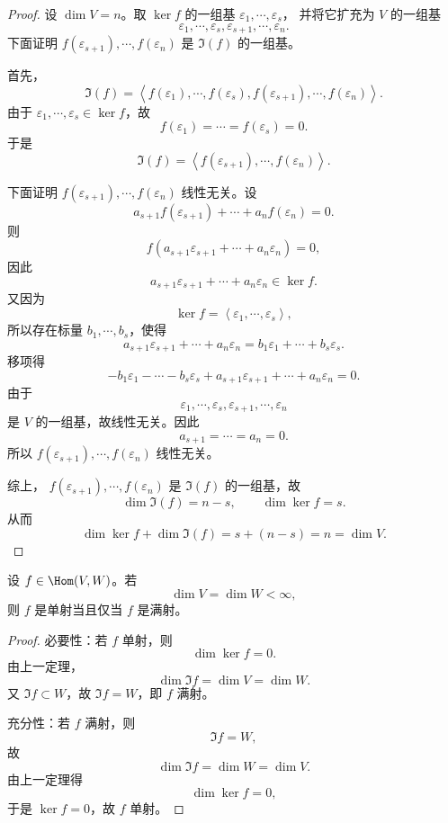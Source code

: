 \begin{proof}
	设 $\dim V=n$。取 $\ker f$ 的一组基
	$\varepsilon_1,\cdots,\varepsilon_s$，
	并将它扩充为 $V$ 的一组基
	\[
	\varepsilon_1,\cdots,\varepsilon_s,
	\varepsilon_{s+1},\cdots,\varepsilon_n.
	\]
	下面证明
	$f(\varepsilon_{s+1}),\cdots,f(\varepsilon_n)$
	是 $\Im(f)$ 的一组基。
	
	首先，
	\[
	\Im(f)
	=\left\langle f(\varepsilon_1),\cdots,f(\varepsilon_s),
	f(\varepsilon_{s+1}),\cdots,f(\varepsilon_n)\right\rangle.
	\]
	由于 $\varepsilon_1,\cdots,\varepsilon_s\in\ker f$，故
	\[
	f(\varepsilon_1)=\cdots=f(\varepsilon_s)=0.
	\]
	于是
	\[
	\Im(f)
	=\left\langle f(\varepsilon_{s+1}),\cdots,f(\varepsilon_n)\right\rangle.
	\]
	
	下面证明
	$f(\varepsilon_{s+1}),\cdots,f(\varepsilon_n)$
	线性无关。设
	\[
	a_{s+1}f(\varepsilon_{s+1})+\cdots+a_nf(\varepsilon_n)=0.
	\]
	则
	\[
	f(a_{s+1}\varepsilon_{s+1}+\cdots+a_n\varepsilon_n)=0,
	\]
	因此
	\[
	a_{s+1}\varepsilon_{s+1}+\cdots+a_n\varepsilon_n\in\ker f.
	\]
	又因为
	\[
	\ker f=\left\langle \varepsilon_1,\cdots,\varepsilon_s\right\rangle,
	\]
	所以存在标量 $b_1,\cdots,b_s$，使得
	\[
	a_{s+1}\varepsilon_{s+1}+\cdots+a_n\varepsilon_n
	=b_1\varepsilon_1+\cdots+b_s\varepsilon_s.
	\]
	移项得
	\[
	-b_1\varepsilon_1-\cdots-b_s\varepsilon_s
	+a_{s+1}\varepsilon_{s+1}+\cdots+a_n\varepsilon_n=0.
	\]
	由于
	\[
	\varepsilon_1,\cdots,\varepsilon_s,
	\varepsilon_{s+1},\cdots,\varepsilon_n
	\]
	是 $V$ 的一组基，故线性无关。因此
	\[
	a_{s+1}=\cdots=a_n=0.
	\]
	所以
	$f(\varepsilon_{s+1}),\cdots,f(\varepsilon_n)$
	线性无关。
	
	综上，
	$f(\varepsilon_{s+1}),\cdots,f(\varepsilon_n)$
	是 $\Im(f)$ 的一组基，故
	\[
	\dim\Im(f)=n-s,
	\qquad
	\dim\ker f=s.
	\]
	从而
	\[
	\dim\ker f+\dim\Im(f)=s+(n-s)=n=\dim V.
	\]
\end{proof}

\begin{corollary}
	设 $f\in\Hom(V,W)$。若
	\[
	\dim V=\dim W<\infty,
	\]
	则 $f$ 是单射当且仅当 $f$ 是满射。
\end{corollary}

\begin{proof}
	必要性：若 $f$ 单射，则
	\[
	\dim\ker f=0.
	\]
	由上一定理，
	\[
	\dim\Im f=\dim V=\dim W.
	\]
	又 $\Im f\subset W$，故 $\Im f=W$，即 $f$ 满射。
	
	充分性：若 $f$ 满射，则
	\[
	\Im f=W,
	\]
	故
	\[
	\dim\Im f=\dim W=\dim V.
	\]
	由上一定理得
	\[
	\dim\ker f=0,
	\]
	于是 $\ker f=0$，故 $f$ 单射。
\end{proof}

